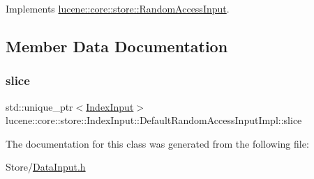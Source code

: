 Implements \mbox{\hyperlink{classlucene_1_1core_1_1store_1_1RandomAccessInput_abb5d56744a927492a2dc0cf0bc8407b3}{lucene\+::core\+::store\+::\+Random\+Access\+Input}}.



\subsection{Member Data Documentation}
\mbox{\label{classlucene_1_1core_1_1store_1_1IndexInput_1_1DefaultRandomAccessInputImpl_ae9d2c6a7d3e70475ef1746ad1d2d985b}} 
\subsubsection{\texorpdfstring{slice}{slice}}
{\footnotesize\ttfamily std\+::unique\+\_\+ptr$<$\mbox{\hyperlink{classlucene_1_1core_1_1store_1_1IndexInput}{Index\+Input}}$>$ lucene\+::core\+::store\+::\+Index\+Input\+::\+Default\+Random\+Access\+Input\+Impl\+::slice\hspace{0.3cm}{\ttfamily [private]}}



The documentation for this class was generated from the following file\+:\begin{DoxyCompactItemize}
\item 
Store/\mbox{\hyperlink{DataInput_8h}{Data\+Input.\+h}}\end{DoxyCompactItemize}
